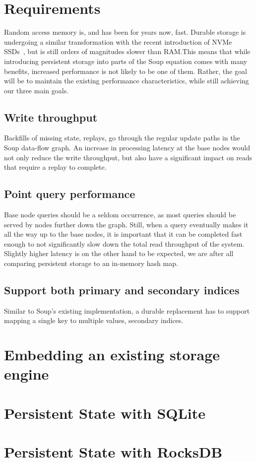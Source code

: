 \section{Requirements}
Random access memory is, and has been for years now, fast. Durable storage is
undergoing a similar transformation with the recent introduction of NVMe
SSDs~\cite{nvme}, but is still orders of magnitudes slower than RAM.\@ This
means that while introducing persistent storage into parts of the Soup equation
comes with many benefits, increased performance is not likely to be one of them.
Rather, the goal will be to maintain the existing performance characteristics,
while still achieving our three main goals.

\subsection{Write throughput}
Backfills of missing state, replays, go through the regular update paths in the
Soup data-flow graph. An increase in processing latency at the base nodes would
not only reduce the write throughput, but also have a significant impact on
reads that require a replay to complete.

\subsection{Point query performance}
Base node queries should be a seldom occurrence, as most queries should be
served by nodes further down the graph. Still, when a query eventually makes it
all the way up to the base nodes, it is important that it can be completed fast
enough to not significantly slow down the total read throughput of the system.
Slightly higher latency is on the other hand to be expected, we are after all
comparing persistent storage to an in-memory hash map.

\subsection{Support both primary and secondary indices}
Similar to Soup's existing  implementation, a durable replacement
has to support mapping a single key to multiple values, \ie secondary indices.

\section{Embedding an existing storage engine}

\section{Persistent State with SQLite}

\section{Persistent State with RocksDB}
